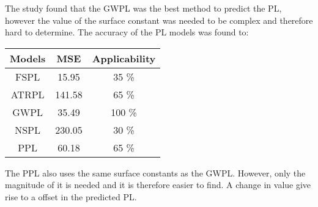\large



The study found that the GWPL was the best method to predict the PL, however the value of the surface constant was needed to be complex and therefore hard to determine. The accuracy of the PL models was found to:

\begin{center}
\begin{tabular}{|c|c|c|}
\hline
\textbf{Models} & \textbf{MSE} & \textbf{Applicability} \\ \hline
FSPL            & 15.95        & 35 \%                  \\ \hline
ATRPL 		    & 141.58       & 65 \%                  \\ \hline %
GWPL            & 35.49        & 100 \%                 \\ \hline
NSPL            & 230.05       & 30 \%                  \\ \hline
PPL            & 60.18        & 65 \%                  \\ \hline
\end{tabular}
\end{center}


The PPL also uses the same surface constants as the GWPL. However, only the magnitude of it is needed and it is therefore easier to find. A change in value give rise to a offset in the predicted PL.

